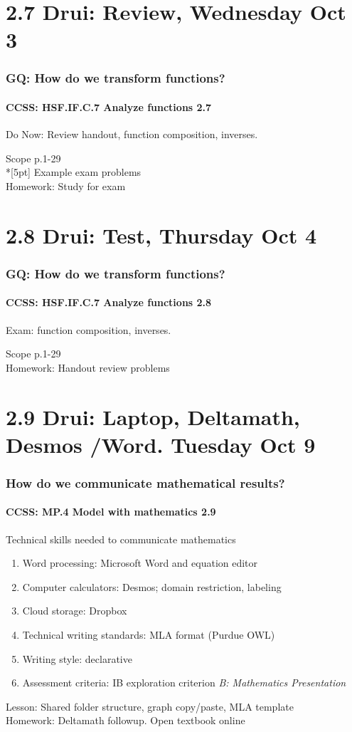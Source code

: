 \documentclass{beamer}
\begin{document}
\section{2.7 Drui: Review, Wednesday Oct 3}
  \frame
  {
    \frametitle{GQ: How do we transform functions?}
    \framesubtitle{CCSS: HSF.IF.C.7 Analyze functions    \alert{2.7}}

    \begin{block}{Do Now: Review handout, function composition, inverses.}
    \end{block}
    Scope p.1-29 \\*[5pt]
    Example exam problems\\ \bigskip
    Homework: Study for exam
    }

\section{2.8 Drui: Test, Thursday Oct 4}
  \frame
  {
    \frametitle{GQ: How do we transform functions?}
    \framesubtitle{CCSS: HSF.IF.C.7 Analyze functions    \alert{2.8}}

    \begin{block}{Exam: function composition, inverses.}
    \end{block}
    Scope p.1-29 \\ \bigskip
    Homework: Handout review problems
    }

\section{2.9 Drui: Laptop, Deltamath, Desmos /Word. Tuesday Oct 9}
  \frame
  {
    \frametitle{How do we communicate mathematical results?}
    \framesubtitle{CCSS: MP.4 Model with mathematics  \alert{2.9}}

    \begin{block}{Technical skills needed to communicate mathematics}
    \begin{enumerate}
        \item Word processing: Microsoft Word and equation editor
        \item Computer calculators: Desmos; domain restriction, labeling
        \item Cloud storage: Dropbox
        \item Technical writing standards: MLA format (Purdue OWL)
        \item Writing style: declarative
        \item Assessment criteria: IB exploration criterion \emph{B: Mathematics Presentation}
    \end{enumerate}
    \end{block}
    Lesson: Shared folder structure, graph copy/paste, MLA template\\ \bigskip
    Homework: Deltamath followup. Open textbook online
  }
\end{document}
